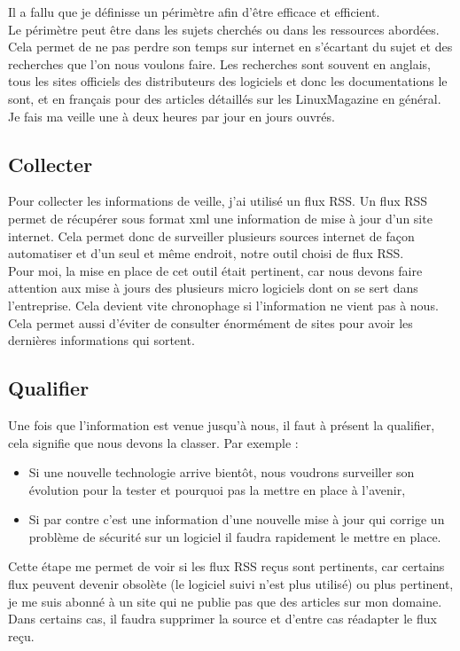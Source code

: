 \documentclass[11pt,a4paper,oneside]{book}
\begin{document}
Il a fallu que je définisse un périmètre afin d'être efficace et efficient. \\

Le périmètre peut être dans les sujets cherchés ou dans les ressources abordées.
Cela permet de ne pas perdre son temps sur internet en s'écartant du sujet et des recherches que l'on nous voulons faire. 
Les recherches sont souvent en anglais, tous les sites officiels des distributeurs des logiciels et donc les documentations le sont, et en français pour des articles détaillés sur les LinuxMagazine en général. \\

Je fais ma veille une à deux heures par jour en jours ouvrés.

\subsection{Collecter}

Pour collecter les informations de veille, j'ai utilisé un flux RSS.
Un flux RSS permet de récupérer sous format xml une information de mise à jour d'un site internet. Cela permet donc de surveiller plusieurs sources internet de façon automatiser et d'un seul et même endroit, notre outil choisi de flux RSS. \\

Pour moi, la mise en place de cet outil était pertinent, car nous devons faire attention aux mise à jours des plusieurs micro logiciels dont on se sert dans l'entreprise. Cela devient vite chronophage si l'information ne vient pas à nous. \\

Cela permet aussi d'éviter de consulter énormément de sites pour avoir les dernières informations qui sortent.

\subsection{Qualifier}

Une fois que l'information est venue jusqu'à nous, il faut à présent la qualifier, cela signifie que nous devons la classer.
Par exemple :
\begin{itemize}
\item Si une nouvelle technologie arrive bientôt, nous voudrons surveiller son évolution pour la tester et pourquoi pas la mettre en place à l'avenir,
\item Si par contre c'est une information d'une nouvelle mise à jour qui corrige un problème de  sécurité sur un logiciel il faudra rapidement le mettre en place.
\end{itemize}
Cette étape me permet de voir si les flux RSS reçus sont pertinents, car certains flux peuvent devenir obsolète (le logiciel suivi n'est plus utilisé) ou plus pertinent, je me suis abonné à un site qui ne publie pas que des articles sur mon domaine. \\
Dans certains cas, il faudra supprimer la source et d'entre cas réadapter le flux reçu.
\end{document}
